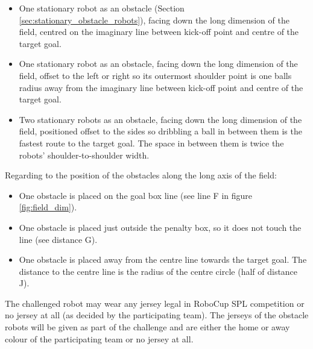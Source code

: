 \begin{itemize}
	\item One stationary robot as an obstacle (\cf Section \ref{sec:stationary_obstacle_robots}), facing down the long dimension of the field, centred on the imaginary line between kick-off point and centre of the target goal.
	\item One stationary robot as an obstacle, facing down the long dimension of the field, offset to the left or right so its outermost shoulder point is one balls radius away from the imaginary line between kick-off point and centre of the target goal. %
	\item Two stationary robots as an obstacle, facing down the long dimension of the field, positioned offset to the sides so dribbling a ball in between them is the fastest route to the target goal. The space in between them is twice the robots' shoulder-to-shoulder width. %
\end{itemize}

Regarding to the position of the obstacles along the long axis of the field:

\begin{itemize}
	\item One obstacle is placed on the goal box line (see line F in figure \ref{fig:field_dim}).
	\item One obstacle is placed just outside the penalty box, so it does not touch the line (see distance  G).
	\item One obstacle is placed away from the centre line towards the target goal. The distance to the centre line is the radius of the centre circle (half of distance J).
\end{itemize}

The challenged robot may wear any jersey legal in RoboCup SPL competition or no jersey at all (as decided by the participating team). The jerseys of the obstacle robots will be given as part of the challenge and are either the home or away colour of the participating team or no jersey at all.

